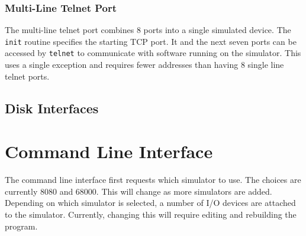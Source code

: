 \documentclass[10pt, openany]{book}
\begin{document}
\subsection{Multi-Line Telnet Port}
The multi-line telnet port combines 8 ports into a single simulated device.  The \verb|init| routine specifies the starting TCP port.  It and the next seven ports can be accessed by \verb|telnet| to communicate with software running on the simulator.  This uses a single exception and requires fewer addresses than having 8 single line telnet ports.
\section{Disk Interfaces}

\chapter{Command Line Interface}
The command line interface first requests which simulator to use.  The choices are currently 8080 and 68000.  This will change as more simulators are added.  Depending on which simulator is selected, a number of I/O devices are attached to the simulator.  Currently, changing this will require editing and rebuilding the program.
\end{document}
